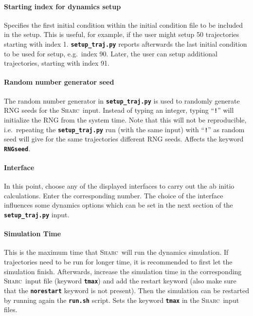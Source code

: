 \documentclass[a4paper,10pt,DIV=15,openany,twoside=false]{scrbook}
\newcommand{\sharc}{\textsc{Sharc}}
\newcommand{\ttt}[1]{\textbf{\texttt{#1}}}
\begin{document}
\paragraph{Starting index for dynamics setup}

Specifies the first initial condition within the initial condition file to be included in the setup. This is useful, for example, if the user might setup 50 trajectories starting with index 1. \ttt{setup\_traj.py} reports afterwards the last initial condition to be used for setup, e.g.\ index 90. Later, the user can setup additional trajectories, starting with index 91.

\paragraph{Random number generator seed}

The random number generator in \ttt{setup\_traj.py} is used to randomly generate RNG seeds for the \sharc\ input. Instead of typing an integer, typing ``\ttt{!}'' will initialize the RNG from the system time. Note that this will not be reproducible, i.e.\ repeating the \ttt{setup\_traj.py} run (with the same input) with ``\ttt{!}'' as random seed will give for the same trajectories different RNG seeds. Affects the keyword \ttt{RNGseed}.

\paragraph{Interface}

In this point, choose any of the displayed interfaces to carry out the ab initio calculations. Enter the corresponding number. The choice of the interface influences some dynamics options which can be set in the next section of the \ttt{setup\_traj.py} input.

\paragraph{Simulation Time}

This is the maximum time that \sharc\ will run the dynamics simulation. If trajectories need to be run for longer time, it is recommended to first let the simulation finish. Afterwards, increase the simulation time in the corresponding \sharc\ input file (keyword \ttt{tmax}) and add the restart keyword (also make sure that the \ttt{norestart} keyword is not present). Then the simulation can be restarted by running again the \ttt{run.sh} script. Sets the keyword \ttt{tmax} in the \sharc\ input files.
\end{document}
